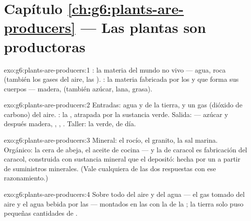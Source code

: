 \section*{Capítulo \ref{ch:g6:plants-are-producers} --- Las plantas son productoras}

\begin{solution}{exo:g6:plants-are-producers:1}
: la materia del mundo no vivo --- agua, roca (también
los gases del aire, las ). : la materia
fabricada por los  y que forma sus cuerpos --- madera,
 (también azúcar, lana, grasa).
\end{solution}

\begin{solution}{exo:g6:plants-are-producers:2}
Entradas: agua y  de la tierra, y un gas (dióxido de
carbono) del aire. : la , atrapada por la sustancia verde.
Salida:  --- azúcar y después madera, , ,
. Taller: la  verde, de día.
\end{solution}

\begin{solution}{exo:g6:plants-are-producers:3}
Mineral: el rocío, el granito, la sal marina. Orgánico: la cera de
abeja, el aceite de cocina --- y la  de caracol es fabricación
del caracol, construida con sustancia mineral que el  depositó:
hecha por un  a partir de suministros minerales. (Vale
cualquiera de las dos respuestas con ese razonamiento.)
\end{solution}

\begin{solution}{exo:g6:plants-are-producers:4}
Sobre todo del aire y del agua --- el gas tomado del aire y el agua
bebida por las  --- montados en las  con la  de la
; la tierra solo puso pequeñas cantidades de .
\end{solution}

